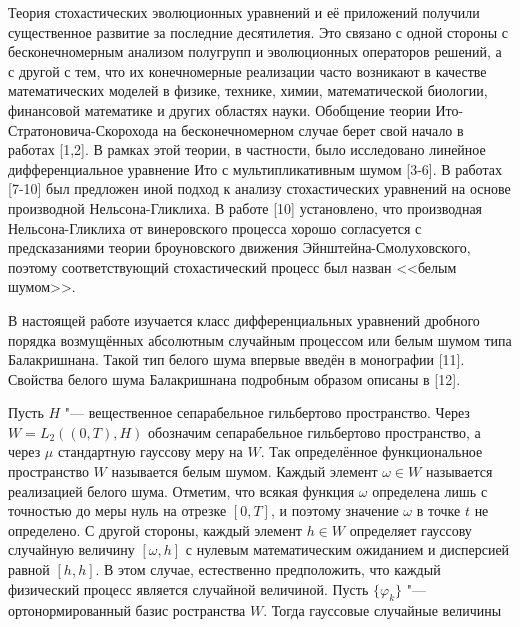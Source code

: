 
\vzmscaption


Теория стохастических эволюционных уравнений и её приложений получили существенное развитие за последние десятилетия. Это связано с одной стороны с бесконечномерным анализом полугрупп и эволюционных операторов решений, а с другой с тем, что их конечномерные реализации часто возникают в качестве математических моделей в физике, технике,
химии, математической биологии, финансовой математике и других областях науки. Обобщение теории Ито-Стратоновича-Скорохода на бесконечномерном случае берет свой начало в работах [1,2]. В рамках этой теории, в частности, было исследовано линейное дифференциальное уравнение Ито с мультипликативным шумом [3-6]. В работах [7-10] был
предложен иной подход к анализу стохастических уравнений на основе производной Нельсона-Гликлиха. В работе [10] установлено, что производная Нельсона-Гликлиха от винеровского процесса хорошо согласуется с предсказаниями теории броуновского движения Эйнштейна-Смолуховского, поэтому соответствующий стохастический процесс был назван <<белым шумом>>.

В настоящей работе изучается класс дифференциальных уравнений дробного порядка возмущённых абсолютным случайным процессом или белым шумом типа Балакришнана. Такой тип белого шума впервые введён в монографии [11]. Свойства белого шума Балакришнана подробным образом описаны в [12].

Пусть $H$ "--- вещественное сепарабельное гильбертово пространство. Через $W=L_{2}((0,T),H)$ обозначим сепарабельное гильбертово пространство, а через $\mu$ стандартную гауссову меру на $W$. Так определённое функциональное пространство $W$ называется белым шумом. Каждый элемент $\omega\in W$ называется реализацией белого шума. Отметим, что всякая функция $\omega$ определена лишь с точностью до меры нуль на отрезке $[0, T]$, и поэтому значение $\omega$ в точке $t$ не определено. С другой стороны, каждый элемент $h\in W$ определяет гауссову случайную величину $[\omega, h]$ с нулевым математическим ожиданием и дисперсией равной $[h, h]$. В этом случае, естественно предположить, что каждый физический процесс является случайной величиной. Пусть $\{\varphi_{k}\}$ "--- ортонормированный базис ространства $W$. Тогда гауссовые случайные величины

